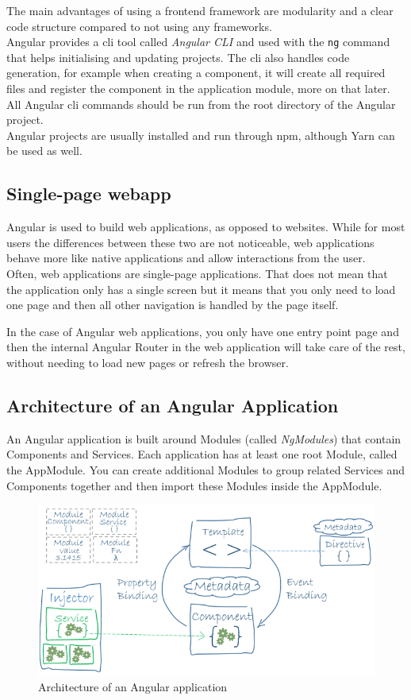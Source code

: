 \documentclass[twoside, openright,11pt,a4paper]{book}
\begin{document}
The main advantages of using a frontend framework are modularity and a clear code structure compared to not using any frameworks. \\

Angular provides a \gls{cli} tool called \emph{Angular CLI} and used with the \verb+ng+ command that helps initialising and updating projects. The \gls{cli} also handles code generation, for example when creating a component, it will create all required files and register the component in the application module, more on that later. All Angular \gls{cli} commands should be run from the root directory of the Angular project. \\

Angular projects are usually installed and run through \gls{npm}, although Yarn can be used as well.
\subsection{Single-page webapp}
Angular is used to build web applications, as opposed to websites. While for most users the differences between these two are not noticeable, web applications behave more like native applications and allow interactions from the user.\\

Often, web applications are single-page applications. That does not mean that the application only has a single screen but it means that you only need to load one page and then all other navigation is handled by the page itself.

In the case of Angular web applications, you only have one entry point page and then the internal Angular Router in the web application will take care of the rest, without needing to load new pages or refresh the browser.
\subsection{Architecture of an Angular Application}
An Angular application is built around Modules (called \emph{NgModules})\cite{angular:doc:modules} that contain Components and Services. Each application has at least one root Module, called the AppModule. You can create additional Modules to group related Services and Components together and then import these Modules inside the AppModule.
\begin{figure}[H]
\begin{center}
	\includegraphics[width=.8\textwidth]{assets/angular_architecture}
	\caption[Architecture of an Angular application]{Architecture of an Angular application\cite{angular:ref:architecture}}
\end{center}
\end{figure}
\end{document}
